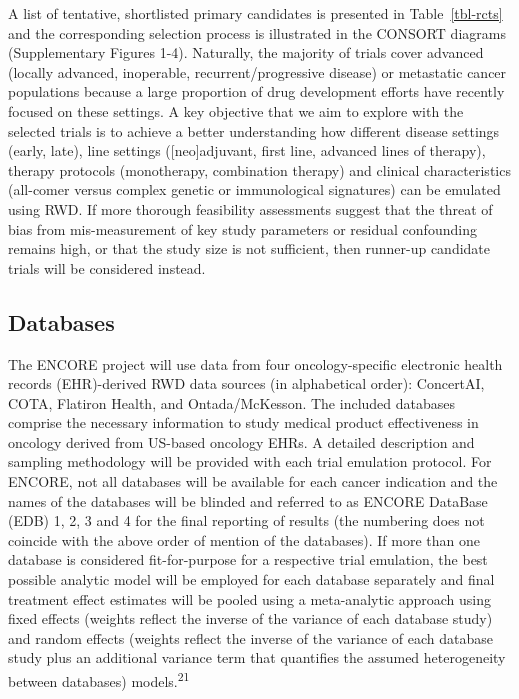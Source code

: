 \documentclass[
  letterpaper,
  DIV=11,
  numbers=noendperiod]{scrartcl}
\begin{document}
A list of tentative, shortlisted primary candidates is presented in
Table~\ref{tbl-rcts} and the corresponding selection process is
illustrated in the CONSORT diagrams (Supplementary Figures 1-4).
Naturally, the majority of trials cover advanced (locally advanced,
inoperable, recurrent/progressive disease) or metastatic cancer
populations because a large proportion of drug development efforts have
recently focused on these settings. A key objective that we aim to
explore with the selected trials is to achieve a better understanding
how different disease settings (early, late), line settings
({[}neo{]}adjuvant, first line, advanced lines of therapy), therapy
protocols (monotherapy, combination therapy) and clinical
characteristics (all-comer versus complex genetic or immunological
signatures) can be emulated using RWD. If more thorough feasibility
assessments suggest that the threat of bias from mis-measurement of key
study parameters or residual confounding remains high, or that the study
size is not sufficient, then runner-up candidate trials will be
considered instead.

\subsection{Databases}\label{databases}

The ENCORE project will use data from four oncology-specific electronic
health records (EHR)-derived RWD data sources (in alphabetical order):
ConcertAI, COTA, Flatiron Health, and Ontada/McKesson. The included
databases comprise the necessary information to study medical product
effectiveness in oncology derived from US-based oncology EHRs. A
detailed description and sampling methodology will be provided with each
trial emulation protocol. For ENCORE, not all databases will be
available for each cancer indication and the names of the databases will
be blinded and referred to as ENCORE DataBase (EDB) 1, 2, 3 and 4 for
the final reporting of results (the numbering does not coincide with the
above order of mention of the databases). If more than one database is
considered fit-for-purpose for a respective trial emulation, the best
possible analytic model will be employed for each database separately
and final treatment effect estimates will be pooled using a
meta-analytic approach using fixed effects (weights reflect the inverse
of the variance of each database study) and random effects (weights
reflect the inverse of the variance of each database study plus an
additional variance term that quantifies the assumed heterogeneity
between databases) models.\textsuperscript{21}
\end{document}
